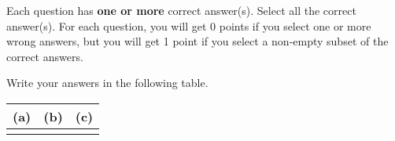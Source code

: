 
Each question has \textbf{one or more} correct answer(s). Select all the correct answer(s). For each question, you will get 0 points if you select one or more wrong answers, but you will get 1 point if you select a non-empty subset of the correct answers.

Write your answers in the following table.


\begin{table}[htbp]
    \centering
    \begin{tabular}{|p{2cm}|p{2cm}|p{2cm}|}
        \hline
        (a) & (b) & (c) \\
        \hline
        &     &     \\
        \hline
    \end{tabular}\label{tab:multiple}
\end{table}

